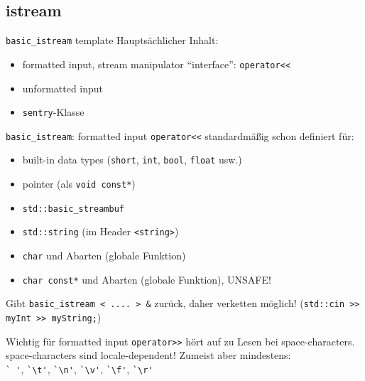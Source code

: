 \subsection{istream}

\begin{frame}{\texttt{basic\_istream} template}
	Hauptsächlicher Inhalt:
	\begin{itemize}
		\item formatted input, stream manipulator \enquote{interface}: \texttt{operator<<}
		\item unformatted input
		\item \texttt{sentry}-Klasse
	\end{itemize}
\end{frame}

\begin{frame}[fragile]{\texttt{basic\_istream}: formatted input}
	\texttt{operator<<} standardmäßig schon definiert für:
	\begin{itemize}
		\item built-in data types (\texttt{short}, \texttt{int}, \texttt{bool}, \texttt{float} usw.)
		\item pointer (als \texttt{void const*})
		\item \texttt{std::basic\_streambuf}
		\item \texttt{std::string} (im Header \texttt{<string>})
		\item \texttt{char} und Abarten {\tiny (globale Funktion)}
		\item \texttt{char const*} und Abarten {\tiny (globale Funktion)}, \alert{UNSAFE!}
	\end{itemize}
	Gibt \texttt{basic\_istream < .... > \&} zurück, daher verketten möglich! (\texttt{std::cin >> myInt >> myString;})
	
	\pause
	\vspace{1em}
	
	\begin{block}{Wichtig für formatted input}
		\texttt{operator>>} hört auf zu Lesen bei space-characters.
		space-characters sind locale-dependent! Zumeist aber mindestens:\\
		\verb|` '|, \verb|`\t'|, \verb|`\n'|, \verb|`\v'|, \verb|`\f'|, \verb|`\r'|
	\end{block}
\end{frame}

